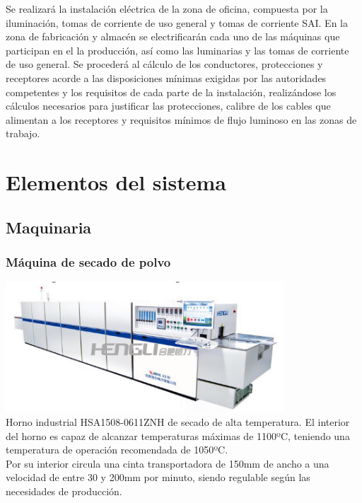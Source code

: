 Se realizará la instalación eléctrica de la zona de oficina, compuesta por la iluminación, tomas de corriente de uso general y tomas de corriente SAI. En la zona de fabricación y almacén se electrificarán cada uno de las máquinas que participan en el la producción, así como las luminarias y las tomas de corriente de uso general. Se procederá al cálculo de los conductores, protecciones y receptores acorde a las disposiciones mínimas exigidas por las autoridades competentes y los requisitos de cada parte de la instalación, realizándose los cálculos necesarios para justificar las protecciones, calibre de los cables que alimentan a los receptores y requisitos mínimos de flujo luminoso en las zonas de trabajo.

\pagebreak

\section{Elementos del sistema}

\subsection{Maquinaria}
	\subsubsection{Máquina de secado de polvo}

	\includegraphics[scale=1]{Datasheets/1HornoFoto.png}\\

	Horno industrial HSA1508-0611ZNH de secado de alta temperatura. El interior del horno es capaz de alcanzar temperaturas máximas de 1100ºC, teniendo una temperatura de operación recomendada de 1050ºC.\\

	Por su interior circula una cinta transportadora de 150mm de ancho a una velocidad de entre 30 y 200mm por minuto, siendo regulable según las necesidades de producción.\\

